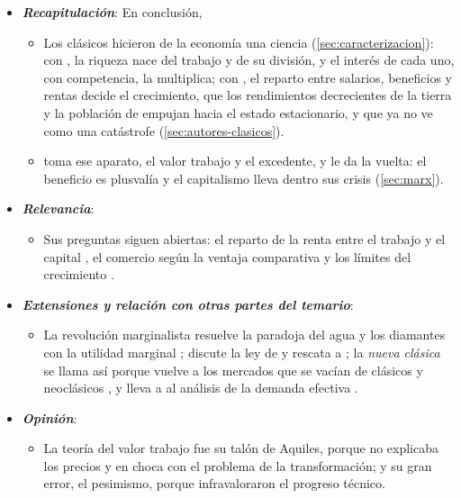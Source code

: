 \documentclass[11pt]{article}
\begin{document}
\begin{itemize}
\item \textbf{\emph{Recapitulación}}: En conclusión,
  \begin{itemize}
  \item Los clásicos hicieron de la economía una ciencia (\ref{sec:caracterizacion}): con , la riqueza nace del trabajo y de su división, y el interés de cada uno, con competencia, la multiplica; con , el reparto entre salarios, beneficios y rentas decide el crecimiento, que los rendimientos decrecientes de la tierra y la población de  empujan hacia el estado estacionario, y que  ya no ve como una catástrofe (\ref{sec:autores-clasicos}).

  \item {} toma ese aparato, el valor trabajo y el excedente, y le da la vuelta: el beneficio es plusvalía y el capitalismo lleva dentro sus crisis (\ref{sec:marx}).
  \end{itemize}
\item \textbf{\emph{Relevancia}}:
  \begin{itemize}
  \item Sus preguntas siguen abiertas: el reparto de la renta entre el trabajo y el capital , el comercio según la ventaja comparativa  y los límites del crecimiento .
  \end{itemize}
\item \textbf{\emph{Extensiones y relación con otras partes del temario}}:
  \begin{itemize}
  \item La revolución marginalista resuelve la paradoja del agua y los diamantes con la utilidad marginal ;  discute la ley de  y rescata a  ; la \emph{nueva clásica} se llama así porque vuelve a los mercados que se vacían de clásicos y neoclásicos , y  lleva a  al análisis de la demanda efectiva .
  \end{itemize}
\item \textbf{\emph{Opinión}}:
  \begin{itemize}
  \item La teoría del valor trabajo fue su talón de Aquiles, porque no explicaba los precios y en  choca con el problema de la transformación; y su gran error, el pesimismo, porque infravaloraron el progreso técnico.


\end{itemize}
\end{itemize}
\end{document}

